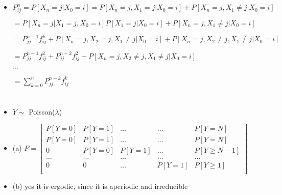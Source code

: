 \documentclass[a4paper]{article}
\begin{document}
\section{}
\begin{itemize}
        \begin{figure} [H]
            \texttt{[image: image/4.png]}
        \end{figure}
    \item $P_{ij}^n = P[X_n = j|X_0 = i] = P[X_n = j, X_1 = j|X_0=i] + P[X_n = j, X_1 \not = j|X_0=i]$

        $= P[X_n = j|X_1 = j, X_0=i]P[X_1=j|X_0=i] + P[X_n = j, X_1 \not = j|X_0=i]$

        $= P_{jj}^{n-1} f_{ij}^k + P[X_n = j, X_2 = j, X_1 \not = j|X_0=i] + P[X_n = j, X_2 \not = j, X_1 \not = j|X_0=i]$

        $= P_{jj}^{n-1} f_{ij}^2 + P_{jj}^{n-2} f_{ij}^2 + P[X_n = j, X_2 \not = j, X_1 \not = j|X_0=i]$

        $\dots$

        $= \sum_{k=0}^n P_{jj}^{n-k} f_{ij}^k$
\end{itemize}

\section{}
\begin{itemize}
        \begin{figure} [H]
            \texttt{[image: image/5.png]}
        \end{figure}
    \item $Y \sim$ Poisson($\lambda$)
    \item (a) $P = \left[ \begin{array}{ccccc}
                P[Y=0] & P[Y=1] & \dots & \dots & P[Y=N] \\
                P[Y=0] & P[Y=1] & \dots & \dots & P[Y=N] \\
                0 & P[Y=0] & P[Y=1] & \dots & P[Y\geq N-1] \\
                \dots & \dots & \dots & \dots & \dots \\
                0 & 0 & \dots & P[Y=1] & P[Y\geq 1] \\
            \end{array} \right]$
    \item (b) yes it is ergodic, since it is aperiodic and irreducible
\end{itemize}
\end{document}
